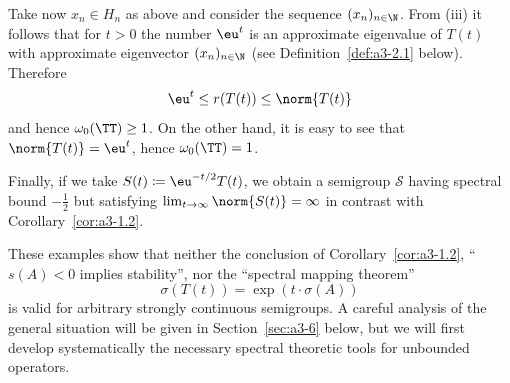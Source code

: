 Take now $x_{n} \in H_{n}$ as above and consider the sequence $(x_{n})_{n \in \N}$.
From (iii) it follows that for $t > 0$ the number $\eu^{t}$ is an approximate eigenvalue of\/ $T(t)$ with approximate eigenvector $(x_{n})_{n \in \N}$ (see Definition~\ref{def:a3-2.1} below).
Therefore 
%
\[
	 \eu^{t} \leq r(T(t)) \leq \norm{T(t)}
\]
%
and hence $\omega_{0}(\TT) \geq 1$.
On the other hand, it is easy to see that $\norm{T(t)} = \eu^{t}$, hence $\omega_{0}(\TT) = 1$.


Finally, if we take $S(t) \coloneqq \eu^{-t/2}T(t)$, we obtain a semigroup $\mathcal{S}$ 
having spectral bound $-\frac{1}{2}$ but satisfying $\lim_{t \to \infty} \norm{S(t)} = \infty$ in contrast with Corollary~\ref{cor:a3-1.2}.

These examples show that neither the conclusion of Corollary~\ref{cor:a3-1.2}, \ie \enquote{$s(A) < 0$ implies stability}, nor the \enquote{spectral mapping theorem}
\[
    \sigma(T(t)) = \exp(t\cdot\sigma(A))
\]
is valid for arbitrary strongly continuous semigroups.
A careful analysis of the general situation will be given in Section~\ref{sec:a3-6} below, but we will first develop systematically the necessary spectral theoretic tools for unbounded operators.
